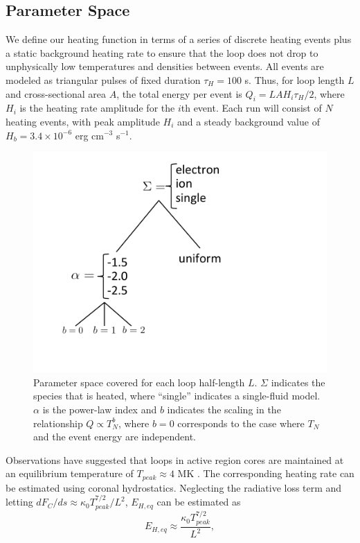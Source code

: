 \documentclass[tighten,apj]{emulateapj}
\begin{document}
	\subsection{Parameter Space}
	\label{subsec:params}
	\par We define our heating function in terms of a series of discrete heating events plus a static background heating rate to ensure that the loop does not drop to unphysically low temperatures and densities between events. All events are modeled as triangular pulses of fixed duration $\tau_H=100$ s. Thus, for loop length $L$ and cross-sectional area $A$, the total energy per event is $Q_i=LAH_i\tau_H/2$, where $H_i$ is the heating rate amplitude for the $i$th event. Each run will consist of $N$ heating events, with peak amplitude $H_i$ and a steady background value of $H_b=3.4\times10^{-6}$ erg cm$^{-3}$ s$^{-1}$.
	\begin{figure}
		\centering
		\includegraphics[width=0.6\columnwidth]{figures/parameter_space.pdf}
		\caption{Parameter space covered for each loop half-length $L$. $\Sigma$ indicates the species that is heated, where ``single'' indicates a single-fluid model. $\alpha$ is the power-law index and $b$ indicates the scaling in the relationship $Q\propto T_N^b$, where $b=0$ corresponds to the case where $T_N$ and the event energy are independent.}
		\label{fig:parameter_space}
	\end{figure}
	\par Observations have suggested that loops in active region cores are maintained at an equilibrium temperature of $T_{peak}\approx4$ MK \citep{warren_constraints_2011,warren_systematic_2012}. The corresponding heating rate can be estimated using coronal hydrostatics. Neglecting the radiative loss term and letting $dF_C/ds\approx\kappa_0T_{peak}^{7/2}/L^2$, $E_{H,eq}$ can be estimated as 
	\begin{equation}
		\label{eq:heating_rate_est}
		E_{H,eq} \approx \frac{\kappa_0T_{peak}^{7/2}}{L^2},
	\end{equation}
\end{document}
